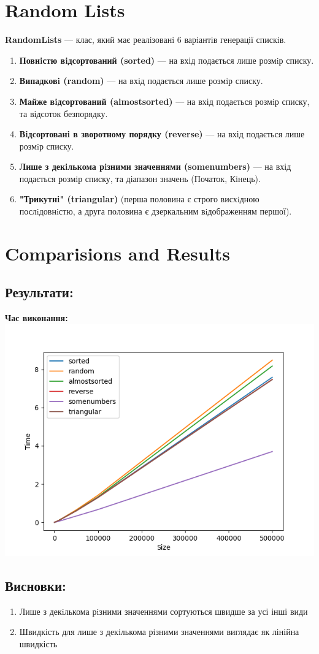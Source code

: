 \documentclass{article}
\begin{document}
\section{Random Lists}
\textbf{RandomLists} --- клас, який має реалiзованi 6 варiантів генерацiї спискiв.
\begin{enumerate}
    \item \textbf{Повнiстю вiдсортований (sorted)} --- на вхід подається лише розмiр списку.
    \item \textbf{Випадковi (random)} --- на вхід подається лише розмiр списку.
    \item \textbf{Майже вiдсортований (almostsorted)} --- на вхід подається розмiр списку, та відсоток безпорядку.
    \item \textbf{Вiдсортованi в зворотному порядку (reverse)} --- на вхід подається лише розмiр списку.
    \item \textbf{Лише з декiлькома рiзними значеннями (somenumbers)} --- на вхід подається розмiр списку, та діапазон значень (Початок, Кiнець).
    \item \textbf{"Трикутнi" (triangular)} (перша половина є строго висхiдною послiдовнiстю, а друга половина є дзеркальним вiдображенням першої).
\end{enumerate}
\newpage

\section{Comparisions and Results}
    \subsection{Результати:}
    \textbf{Час виконання:}
    \newline
        \includegraphics{triangular_Time_7_numbers.png}
    \subsection{Висновки:}
    \begin{enumerate}
        \item Лише з декiлькома рiзними значеннями сортуються швидше за усі інші види
        \item Швидкість для лише з декiлькома рiзними значеннями виглядає як лінійна швидкість
    \end{enumerate}
    \newpage
\end{document}
